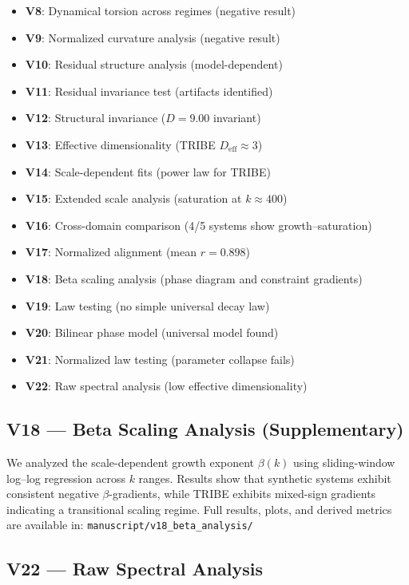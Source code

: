 \begin{itemize}
	\item \textbf{V8}: Dynamical torsion across regimes (negative result)
	\item \textbf{V9}: Normalized curvature analysis (negative result)
	\item \textbf{V10}: Residual structure analysis (model-dependent)
	\item \textbf{V11}: Residual invariance test (artifacts identified)
	\item \textbf{V12}: Structural invariance ($D = 9.00$ invariant)
	\item \textbf{V13}: Effective dimensionality (TRIBE $D_{\mathrm{eff}} \approx 3$)
	\item \textbf{V14}: Scale-dependent fits (power law for TRIBE)
	\item \textbf{V15}: Extended scale analysis (saturation at $k \approx 400$)
	\item \textbf{V16}: Cross-domain comparison (4/5 systems show growth--saturation)
	\item \textbf{V17}: Normalized alignment (mean $r = 0.898$)
	\item \textbf{V18}: Beta scaling analysis (phase diagram and constraint gradients)
	\item \textbf{V19}: Law testing (no simple universal decay law)
	\item \textbf{V20}: Bilinear phase model (universal model found)
	\item \textbf{V21}: Normalized law testing (parameter collapse fails)
	\item \textbf{V22}: Raw spectral analysis (low effective dimensionality)
\end{itemize}

\subsection*{V18 --- Beta Scaling Analysis (Supplementary)}

We analyzed the scale-dependent growth exponent $\beta(k)$ using sliding-window log--log regression across $k$ ranges. Results show that synthetic systems exhibit consistent negative $\beta$-gradients, while TRIBE exhibits mixed-sign gradients indicating a transitional scaling regime. Full results, plots, and derived metrics are available in: \texttt{manuscript/v18\_beta\_analysis/}

\subsection*{V22 --- Raw Spectral Analysis}

